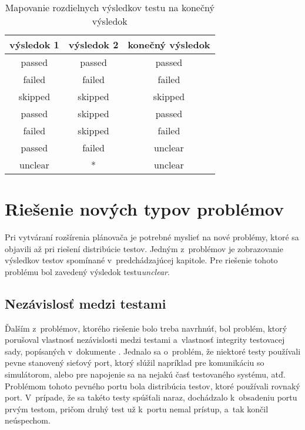 \begin{table}
  \begin{center}
    \begin{tabular}{| c | c | c |}
    \hline
    výsledok 1  & výsledok 2 & konečný výsledok \\ \hline
    passed      & passed     & passed  \\ \hline
    failed      & failed     & failed  \\ \hline
    skipped     & skipped    & skipped \\ \hline
    passed      & skipped    & passed  \\ \hline
    failed      & skipped    & failed  \\ \hline
    passed      & failed     & unclear \\ \hline
    unclear     &      *     & unclear \\ 
    \hline
    \end{tabular}
    \caption{Mapovanie rozdielnych výsledkov testu na konečný výsledok}
    \label{tabulka:vysledky_testu_prevod}
  \end{center}
\end{table}



\section{Riešenie nových typov problémov}
\label{sekcia:riesenie_novych_problemov}
Pri vytváraní rozšírenia plánovača je potrebné myslieť na nové problémy, ktoré sa objavili
až pri riešení distribúcie testov. Jedným z~problémov je zobrazovanie výsledkov testov spomínané v~predchádzajúcej kapitole.
Pre riešenie tohoto problému bol zavedený výsledok testu\emph{unclear}.

\subsection*{Nezávislosť medzi testami}
Ďalším z~problémov, ktorého riešenie bolo treba navrhnúť, bol problém, ktorý porušoval vlastnosť nezávislosti 
medzi testami a~vlastnosť integrity testovacej sady, popísaných v~dokumente \cite{Kapfhammer}.
Jednalo sa o~problém, že niektoré testy používali pevne stanovený sieťový port, ktorý slúžil napríklad pre
komunikáciu so simulátorom, alebo pre napojenie sa na nejakú časť testovaného systému, atď.
Problémom tohoto pevného portu bola distribúcia testov, ktoré používali rovnaký port.
V~prípade, že sa takéto testy spúšťali naraz, dochádzalo k~obsadeniu portu prvým testom, pričom druhý test 
už k~portu nemal prístup, a~tak končil neúspechom.

